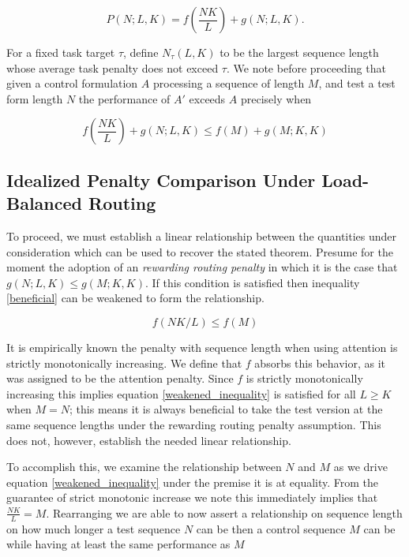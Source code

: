 \documentclass[11pt]{article}
\begin{document}
\begin{equation}
P(N;L,K)=f(\frac{NK}{L})+g(N;L,K).
\end{equation}


For a fixed task target $\tau$, define $N_\tau(L,K)$ to be the largest sequence length whose average task penalty does not exceed $\tau$. We note before proceeding that given a control formulation $A$ processing a sequence of length $M$, and test a test form length $N$ the performance of $A'$ exceeds $A$ precisely when

\begin{equation}
\label{beneficial}
f(\frac{NK}{L})+g(N;L,K) \leq f(M)+g(M;K,K)
\end{equation}

\subsection{Idealized Penalty Comparison Under Load-Balanced Routing}

To proceed, we must establish a linear relationship between the quantities under consideration which can be used to recover the stated theorem. Presume for the moment the adoption of an \emph{rewarding routing penalty} in which it is the case that $g(N;L,K) \leq g(M;K,K)$. If this condition is satisfied then inequality \ref{beneficial} can be weakened to form the relationship.

\begin{equation}
\label{weakened_inequality}
f(NK/L) \leq f(M)
\end{equation}

It is empirically known the penalty with sequence length when using attention is strictly monotonically increasing. We define that $f$ absorbs this behavior, as it was assigned to be the attention penalty. Since $f$ is strictly monotonically increasing this implies equation \ref{weakened_inequality} is satisfied for all $L \geq K$ when $M=N$; this means it is always beneficial to take the test version at the same sequence lengths under the rewarding routing penalty assumption. This does not, however, establish the needed linear relationship.

To accomplish this, we examine the relationship between $N$ and $M$ as we drive equation \ref{weakened_inequality} under the premise it is at equality. From the guarantee of strict monotonic increase we note this immediately implies that $\frac{NK}{L} = M$. Rearranging we are able to now assert a relationship on sequence length on how much longer a test sequence $N$ can be then a control sequence $M$ can be while having at least the same performance as $M$
\end{document}
